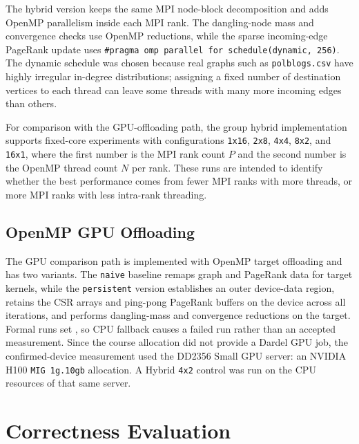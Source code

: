 \documentclass[11pt]{article}
\begin{document}
The hybrid version keeps the same MPI node-block decomposition and adds OpenMP
parallelism inside each MPI rank. The dangling-node mass and convergence checks
use OpenMP reductions, while the sparse incoming-edge PageRank update uses
\texttt{\#pragma omp parallel for schedule(dynamic, 256)}. The dynamic schedule
was chosen because real graphs such as \texttt{polblogs.csv} have highly
irregular in-degree distributions; assigning a fixed number of destination
vertices to each thread can leave some threads with many more incoming edges
than others.

For comparison with the GPU-offloading path, the group hybrid implementation
supports fixed-core experiments with configurations
\texttt{1x16}, \texttt{2x8}, \texttt{4x4}, \texttt{8x2}, and \texttt{16x1},
where the first number is the MPI rank count $P$ and the second number is the
OpenMP thread count $N$ per rank. These runs are intended to identify whether
the best performance comes from fewer MPI ranks with more threads, or more MPI
ranks with less intra-rank threading.

\subsection{OpenMP GPU Offloading}
\label{subsec:wang-gpu}

The GPU comparison path is implemented with OpenMP target offloading and has
two variants. The \texttt{naive} baseline remaps graph and PageRank data for
target kernels, while the \texttt{persistent} version establishes an outer
device-data region, retains the CSR arrays and ping-pong PageRank buffers on
the device across all iterations, and performs dangling-mass and convergence
reductions on the target. Formal runs set , so
CPU fallback causes a failed run rather than an accepted measurement. Since
the course allocation did not provide a Dardel GPU job, the confirmed-device
measurement used the DD2356 Small GPU server: an NVIDIA H100
\texttt{MIG 1g.10gb} allocation. A Hybrid \texttt{4x2} control was run on
the CPU resources of that same server.

\section{Correctness Evaluation}
\label{sec:wang-correctness}
\end{document}
